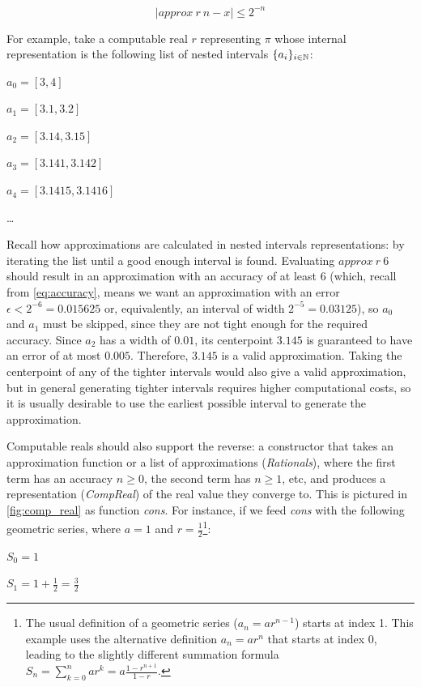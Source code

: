 \begin{equation*}
  | approx\ r\ n - x | \leq 2^{-n}
\end{equation*}

For example, take a computable real $r$ representing $\pi$ whose internal representation is the following list of nested intervals $\{a_i\}_{i \in \mathbb{N}}$:

$a_0 = [3,4]$

$a_1 = [3.1,3.2]$

$a_2 = [3.14,3.15]$

$a_3 = [3.141,3.142]$

$a_4 = [3.1415,3.1416]$

\dots

Recall how approximations are calculated in nested intervals representations: by iterating the list until a good enough interval is found. Evaluating $approx\ r\ 6$ should result in an approximation with an accuracy of at least $6$ (which, recall from \cref{eq:accuracy}, means we want an approximation with an error $\epsilon<2^{-6}=0.015625$ or, equivalently, an interval of width $2^{-5}=0.03125$), so $a_0$ and $a_1$ must be skipped, since they are not tight enough for the required accuracy. Since $a_2$ has a width of $0.01$, its centerpoint $3.145$ is guaranteed to have an error of at most $0.005$. Therefore, $3.145$ is a valid approximation. Taking the centerpoint of any of the tighter intervals would also give a valid approximation, but in general generating tighter intervals requires higher computational costs, so it is usually desirable to use the earliest possible interval to generate the approximation.

Computable reals should also support the reverse: a constructor that takes an approximation function or a list of approximations (\textit{Rationals}), where the first term has an accuracy $n \geq 0$, the second term has $n \geq 1$, etc, and produces a representation (\textit{CompReal}) of the real value they converge to. This is pictured in \cref{fig:comp_real} as function \textit{cons}. For instance, if we feed \textit{cons} with the following geometric series, where $a=1$ and $r=\frac{1}{2}$\footnote{The usual definition of a geometric series ($a_n = ar^{n-1}$) starts at index 1. This example uses the alternative definition $a_n = ar^{n}$ that starts at index 0, leading to the slightly different summation formula $S_n = \sum_{k=0}^{n} ar^k = a\frac{1-r^{n+1}}{1-r}$.}:

$S_0 = 1$

$S_1 = 1 + \frac{1}{2} = \frac{3}{2}$

